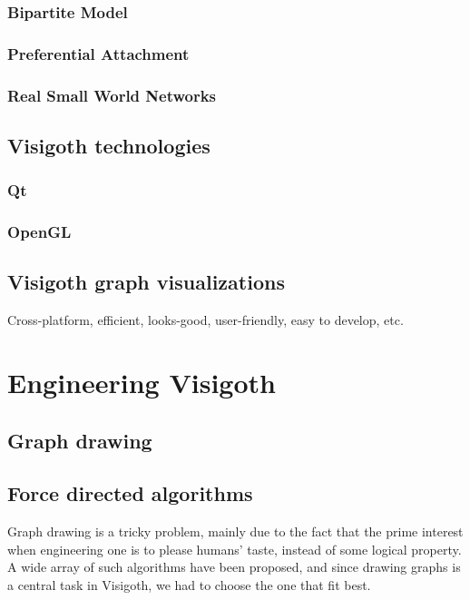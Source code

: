 \documentclass[a4paper,11pt,titlepage]{article}
\let\stdsection\section         %
\renewcommand{\section}{\newpage\stdsection}
\begin{document}
\subsubsection{Bipartite Model}

\subsubsection{Preferential Attachment}

\subsubsection{Real Small World Networks}

\subsection{Visigoth technologies}

\subsubsection{Qt}

\subsubsection{OpenGL}

\subsection{Visigoth graph visualizations}

Cross-platform, efficient, looks-good, user-friendly, easy to develop,
etc.

\section{Engineering Visigoth}

\subsection{Graph drawing}

\subsection{Force directed algorithms}
Graph drawing is a tricky problem, mainly due to the fact that the
prime interest when engineering one is to please humans' taste,
instead of some logical property. A wide array of such algorithms have
been proposed, and since drawing graphs is a central task in Visigoth,
we had to choose the one that fit best.
\end{document}
